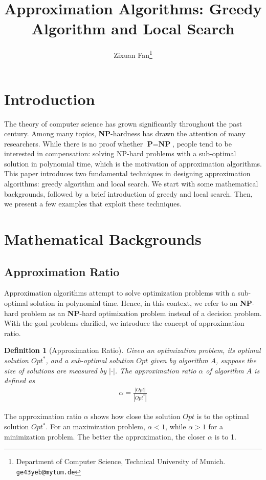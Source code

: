 \documentclass[11pt,psfig,times]{article}
\newcommand*{\PTIME}{\textbf{P}}
\newcommand*{\NP}{\textbf{NP}}
\newtheorem{definition}[theorem]{Definition}
\begin{document}
\title{Approximation Algorithms: Greedy Algorithm and Local Search}
\author{Zixuan Fan\thanks{Department of Computer Science, Technical University of Munich. {\tt ge43yeb@mytum.de}}}
\maketitle
\section{Introduction}
The theory of computer science has grown significantly throughout the past century. Among many topics, \NP-hardness has drawn the attention of many researchers. 
While there is no proof whether $\PTIME=\NP$, people tend to be interested in compensation: solving NP-hard problems with a sub-optimal solution in polynomial time, which is the motivation of approximation algorithms. This paper introduces two fundamental techniques in designing approximation algorithms: greedy algorithm and local search.
We start with some mathematical backgrounds, followed by a brief introduction of greedy and local search. 
Then, we present a few examples that exploit these techniques.

\section{Mathematical Backgrounds}
\subsection{Approximation Ratio}
Approximation algorithms attempt to solve optimization problems with a sub-optimal solution in polynomial time. 
Hence, in this context, we refer to an \NP-hard problem as an \NP-hard optimization problem instead of a decision problem. 
With the goal problems clarified, we introduce the concept of approximation ratio.
\begin{definition}[Approximation Ratio]
    Given an optimization problem, its optimal solution $Opt^*$, and a sub-optimal solution $Opt$ given by algorithm $A$, suppose the size of solutions 
    are measured by $|\cdot|$. The approximation ratio $\alpha$ of algorithm $A$ is defined as 
    \begin{align*}
        \alpha = \frac{|Opt|}{|Opt^*|}
    \end{align*}
\end{definition}
The approximation ratio $\alpha$ shows how close the solution $Opt$ is to the optimal solution $Opt^*$. For an maximization problem, $\alpha < 1$, while $\alpha > 1$
for a minimization problem. The better the approximation, the closer $\alpha$ is to 1.
\end{document}
